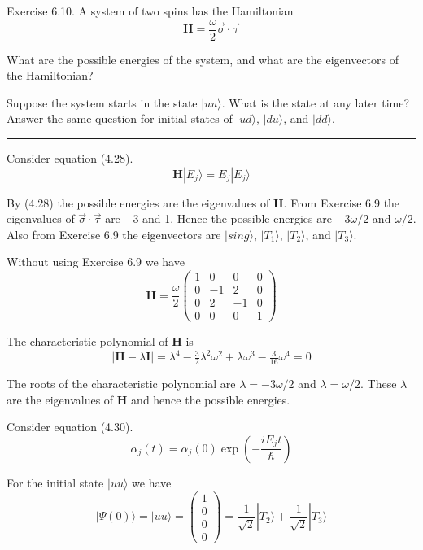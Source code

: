 \documentclass[12pt]{article}
\begin{document}
Exercise 6.10.
A system of two spins has the Hamiltonian
\begin{equation*}
\mathbf H=\frac{\omega}{2}\vec\sigma\cdot\vec\tau
\end{equation*}

What are the possible energies of the system, and what are the
eigenvectors of the Hamiltonian?

\bigskip
Suppose the system starts in the state $|uu\rangle$.
What is the state at any later time?
Answer the same question for initial states of
$|ud\rangle$, $|du\rangle$, and $|dd\rangle$.

\bigskip
\hrule

\bigskip
Consider equation (4.28).
\begin{equation*}
\mathbf H|E_j\rangle=E_j|E_j\rangle
\tag{4.28}
\end{equation*}

By (4.28) the possible energies are the eigenvalues of $\mathbf H$.
From Exercise 6.9 the eigenvalues of $\vec\sigma\cdot\vec\tau$ are $-3$ and 1.
Hence the possible energies are $-3\omega/2$ and $\omega/2$.
Also from Exercise 6.9 the eigenvectors are
$|sing\rangle$, $|T_1\rangle$, $|T_2\rangle$, and $|T_3\rangle$.

\bigskip
Without using Exercise 6.9 we have
\begin{equation*}
\mathbf H=\frac{\omega}{2}
\begin{pmatrix}
1&0&0&0
\\
0&-1&2&0
\\
0&2&-1&0
\\
0&0&0&1
\end{pmatrix}
\end{equation*}

The characteristic polynomial of $\mathbf H$ is
\begin{equation*}
|\mathbf H-\lambda\mathbf I|
=\lambda^4-\tfrac{3}{2}\lambda^2\omega^2+\lambda\omega^3-\tfrac{3}{16}\omega^4=0
\end{equation*}

The roots of the characteristic polynomial are $\lambda=-3\omega/2$ and $\lambda=\omega/2$.
These $\lambda$ are the eigenvalues of $\mathbf H$ and hence the possible energies.

\bigskip
Consider equation (4.30).
\begin{equation*}
\alpha_j(t)=\alpha_j(0)\exp\left(-\frac{iE_jt}{\hbar}\right)
\tag{4.30}
\end{equation*}

For the initial state $|uu\rangle$ we have
\begin{equation*}
|\Psi(0)\rangle=|uu\rangle=\begin{pmatrix}1\\0\\0\\0\end{pmatrix}
=\frac{1}{\sqrt2}|T_2\rangle+\frac{1}{\sqrt2}|T_3\rangle
\end{equation*}
\end{document}
